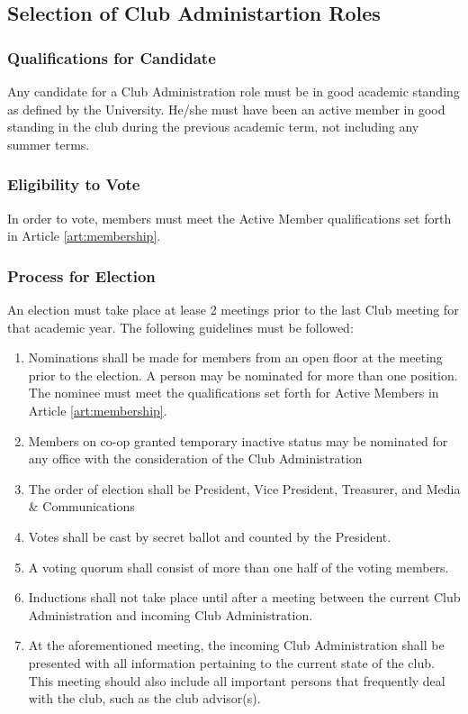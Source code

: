 \documentclass[english,11pt]{article}
\begin{document}
\subsection{Selection of Club Administartion Roles} \label{sect:cadmin:selection}
\subsubsection{Qualifications for Candidate} \label{subsect:cadmin:selection:qualifications}
Any candidate for a Club Administration role must be in good academic standing as defined by the University.
He/she must have been an active member in good standing in the club during the previous academic term, not including any summer terms.

\subsubsection{Eligibility to Vote} \label{subsect:cadmin:selection:eligibility}
In order to vote, members must meet the Active Member qualifications set forth in Article \ref{art:membership}.

\subsubsection{Process for Election} \label{subsect:cadmin:selection:election}
An election must take place at lease 2 meetings prior to the last Club meeting for that academic year. The following guidelines must be followed:

\begin{enumerate}[label=\alph*.]
\item Nominations shall be made for members from an open floor at the meeting prior to the election.
      A person may be nominated for more than one position. The nominee must meet the qualifications set forth for Active Members in Article \ref{art:membership}.
\item Members on co-op granted temporary inactive status may be nominated for any office with the consideration of the Club Administration
\item The order of election shall be President, Vice President, Treasurer, and Media \& Communications
\item Votes shall be cast by secret ballot and counted by the President.
\item A voting quorum shall consist of more than one half of the voting members.
\item Inductions shall not take place until after a meeting between the current Club Administration and incoming Club Administration.
\item At the aforementioned meeting, the incoming Club Administration shall be presented with all information pertaining to the current state of the club. 
      This meeting should also include all important persons that frequently deal with the club, such as the club advisor(s).
\end{enumerate}
\end{document}
